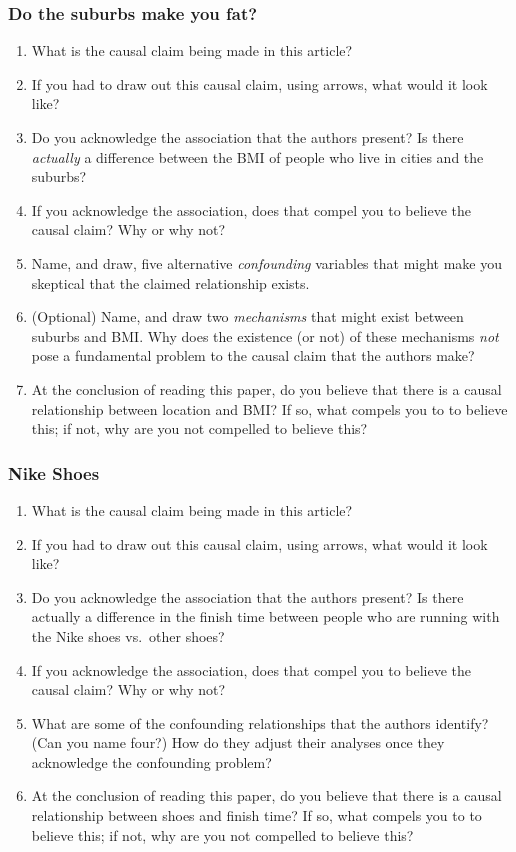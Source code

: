 \documentclass[
]{article}
\providecommand{\tightlist}{%
  \setlength{\itemsep}{0pt}\setlength{\parskip}{0pt}}
\theoremstyle{definition}
\theoremstyle{definition}
\theoremstyle{definition}
\theoremstyle{definition}
\theoremstyle{remark}
\begin{document}
\subsubsection{Do the suburbs make you fat?}\label{do-the-suburbs-make-you-fat}

\begin{enumerate}
\def\labelenumi{\arabic{enumi}.}
\tightlist
\item
  What is the causal claim being made in this article?
\item
  If you had to draw out this causal claim, using arrows, what would it look like?
\item
  Do you acknowledge the association that the authors present? Is there \emph{actually} a difference between the BMI of people who live in cities and the suburbs?
\item
  If you acknowledge the association, does that compel you to believe the causal claim? Why or why not?
\item
  Name, and draw, five alternative \emph{confounding} variables that might make you skeptical that the claimed relationship exists.
\item
  (Optional) Name, and draw two \emph{mechanisms} that might exist between suburbs and BMI. Why does the existence (or not) of these mechanisms \emph{not} pose a fundamental problem to the causal claim that the authors make?
\item
  At the conclusion of reading this paper, do you believe that there is a causal relationship between location and BMI? If so, what compels you to to believe this; if not, why are you not compelled to believe this?
\end{enumerate}

\subsubsection{Nike Shoes}\label{nike-shoes}

\begin{enumerate}
\def\labelenumi{\arabic{enumi}.}
\tightlist
\item
  What is the causal claim being made in this article?
\item
  If you had to draw out this causal claim, using arrows, what would it look like?
\item
  Do you acknowledge the association that the authors present? Is there actually a difference in the finish time between people who are running with the Nike shoes vs.~other shoes?
\item
  If you acknowledge the association, does that compel you to believe the causal claim? Why or why not?
\item
  What are some of the confounding relationships that the authors identify? (Can you name four?) How do they adjust their analyses once they acknowledge the confounding problem?
\item
  At the conclusion of reading this paper, do you believe that there is a causal relationship between shoes and finish time? If so, what compels you to to believe this; if not, why are you not compelled to believe this?
\end{enumerate}
\end{document}
